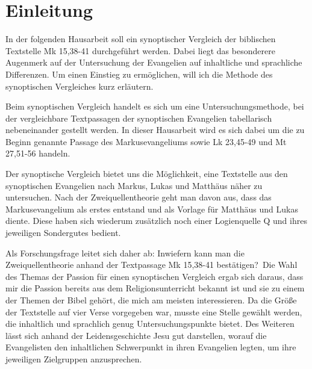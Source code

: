 \section{Einleitung}
In der folgenden Hausarbeit soll ein synoptischer Vergleich der biblischen Textstelle Mk 15,38-41 durchgeführt werden. Dabei liegt das besonderere Augenmerk auf der Untersuchung der Evangelien auf inhaltliche und sprachliche Differenzen. Um einen Einstieg zu ermöglichen, will ich die Methode des synoptischen Vergleiches kurz erläutern.

Beim synoptischen Vergleich handelt es sich um eine Untersuchungsmethode, bei der vergleichbare Textpassagen der synoptischen Evangelien tabellarisch nebeneinander gestellt werden. In dieser Hausarbeit wird es sich dabei um die zu Beginn genannte Passage des Markusevangeliums sowie Lk 23,45-49 und Mt 27,51-56 handeln.

Der synoptische Vergleich bietet uns die Möglichkeit, eine Textstelle aus den synoptischen Evangelien nach Markus, Lukas und Matthäus näher zu untersuchen. Nach der Zweiquellentheorie geht man davon aus, dass das Markusevangelium als erstes entstand und als Vorlage für Matthäus und Lukas diente. Diese haben sich wiederum zusätzlich noch einer Logienquelle Q und ihres jeweiligen Sondergutes bedient.

Als Forschungsfrage leitet sich daher ab: \glqq Inwiefern kann man die Zweiquellentheorie anhand der Textpassage Mk 15,38-41 bestätigen?\grqq\
Die Wahl des Themas der Passion für einen synoptischen Vergleich ergab sich daraus, dass mir die Passion bereits aus dem Religionsunterricht bekannt ist und sie zu einem der Themen der Bibel gehört, die mich am meisten interessieren. Da die Größe der Textstelle auf vier Verse vorgegeben war, musste eine Stelle gewählt werden, die inhaltlich und sprachlich genug Untersuchungspunkte bietet. Des Weiteren lässt sich anhand der Leidensgeschichte Jesu gut darstellen, worauf die Evangelisten den inhaltlichen Schwerpunkt in ihren Evangelien legten, um ihre jeweiligen Zielgruppen anzusprechen.
